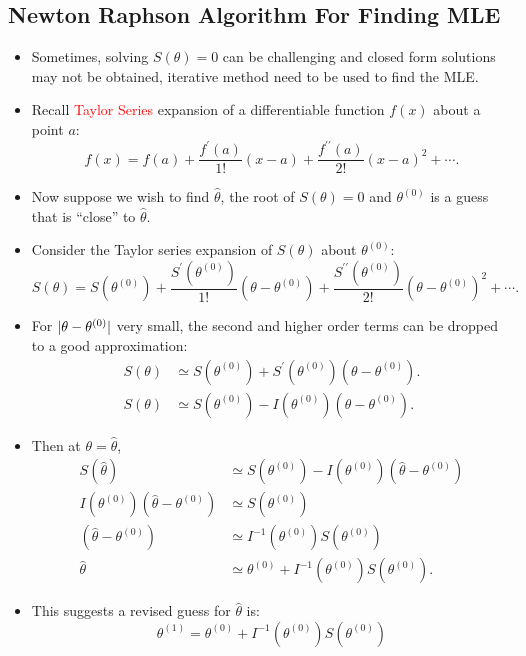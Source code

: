 \documentclass{article}\usepackage[]{graphicx}\usepackage[svgnames]{xcolor}
\DeclarePairedDelimiter\abs{\lvert}{\rvert}
\begin{document}
\subsection*{Newton Raphson Algorithm For Finding MLE}
\begin{itemize}
      \item Sometimes, solving $ S(\theta)=0 $ can be challenging and closed form solutions may
            not be obtained, iterative method need to be used to find the MLE.
      \item Recall \textcolor{Red}{Taylor Series} expansion of a differentiable function $ f(x) $ about a point $ a $:
            \[ f(x)=f(a)+\frac{f^\prime(a)}{1!}(x-a)+\frac{f^{\prime\prime}(a)}{2!}(x-a)^2+\cdots.  \]
      \item Now suppose we wish to find $ \hat{\theta} $, the root of $ S(\theta)=0 $ and $ \theta^{(0)} $ is a guess that
            is ``close'' to $ \hat{\theta} $.
      \item Consider the Taylor series expansion of $ S(\theta) $ about $ \theta^{(0)} $:
            \[ S(\theta)=S(\theta^{(0)})+\frac{S^{\prime}(\theta^{(0)})}{1!}(\theta-\theta^{(0)})+\frac{S^{\prime\prime}(\theta^{(0)})}{2!}(\theta-\theta^{(0)})^2+\cdots.   \]
      \item For $ \abs{\theta-\theta^{(0)}} $ very small, the second and higher order terms can be dropped to a good approximation:
            \begin{align*}
                  S(\theta) & \simeq S(\theta^{(0)})+S^\prime(\theta^{(0)})(\theta-\theta^{(0)}). \\
                  S(\theta) & \simeq S(\theta^{(0)})-I(\theta^{(0)})(\theta-\theta^{(0)}).
            \end{align*}
      \item Then at $ \theta=\hat{\theta} $,
            \begin{align*}
                  S(\hat{\theta})                            & \simeq S(\theta^{(0)})-I(\theta^{(0)})(\hat{\theta}-\theta^{(0)}) \\
                  I(\theta^{(0)})(\hat{\theta}-\theta^{(0)}) & \simeq S(\theta^{(0)})                                            \\
                  (\hat{\theta}-\theta^{(0)})                & \simeq I^{-1}(\theta^{(0)})S(\theta^{(0)})                        \\
                  \hat{\theta}                               & \simeq \theta^{(0)}+I^{-1}(\theta^{(0)})S(\theta^{(0)}).
            \end{align*}
      \item This suggests a revised guess for $ \hat{\theta} $ is:
            \[ \theta^{(1)}=\theta^{(0)}+I^{-1}(\theta^{(0)})S(\theta^{(0)}) \]
\end{itemize}
\end{document}
